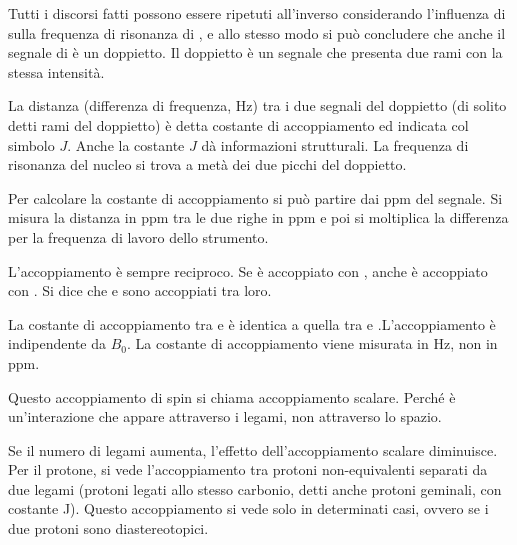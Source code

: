 Tutti i discorsi fatti possono essere ripetuti all'inverso considerando l'influenza di  sulla frequenza di risonanza di , e allo stesso modo si può concludere che anche il segnale di  è un doppietto. Il doppietto è un segnale che presenta due rami con la stessa intensità. 

La distanza (differenza di frequenza, Hz) tra i due segnali del doppietto (di solito detti rami del doppietto) è detta costante di accoppiamento ed indicata col simbolo $J$. Anche la costante $J$ dà informazioni strutturali. 
La frequenza di risonanza del nucleo si trova a metà dei due picchi del doppietto.

Per calcolare la costante di accoppiamento si può
partire dai ppm del segnale. Si misura la distanza in ppm tra le due righe in ppm e poi si moltiplica la differenza per la frequenza di lavoro dello strumento.

L'accoppiamento è sempre reciproco. Se  è accoppiato con , anche  è accoppiato con . Si dice che  e  sono accoppiati tra loro.

La costante di accoppiamento tra  e  è identica a quella tra  e .L'accoppiamento è indipendente da \(B_0\). La costante di accoppiamento viene misurata in Hz, non in ppm.


Questo accoppiamento di spin si chiama accoppiamento scalare. Perché è
un'interazione che appare attraverso i legami, non attraverso lo spazio.


Se il numero di legami aumenta, l'effetto dell'accoppiamento scalare diminuisce. Per il protone, si vede l'accoppiamento tra protoni non-equivalenti separati da due legami (protoni legati allo stesso carbonio, detti anche protoni geminali, con costante J). Questo accoppiamento si vede solo in determinati
casi, ovvero se i due protoni sono diastereotopici.

